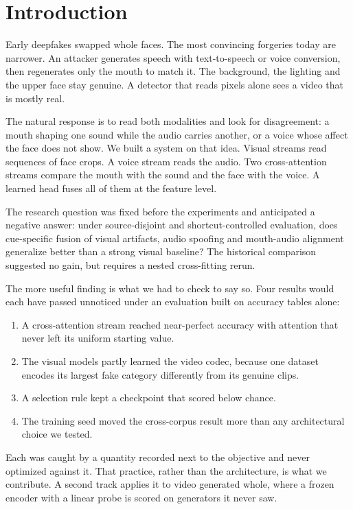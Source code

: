 \documentclass[conference]{IEEEtran}
\begin{document}
\section{Introduction}

Early deepfakes swapped whole faces. The most convincing forgeries today are
narrower. An attacker generates speech with text-to-speech or voice
conversion, then regenerates only the mouth to match it. The background, the
lighting and the upper face stay genuine. A detector that reads pixels alone
sees a video that is mostly real.

The natural response is to read both modalities and look for disagreement: a
mouth shaping one sound while the audio carries another, or a voice whose
affect the face does not show. We built a system on that idea. Visual streams
read sequences of face crops. A voice stream reads the audio. Two
cross-attention streams compare the mouth with the sound and the face with the
voice. A learned head fuses all of them at the feature level.

The research question was fixed before the experiments and anticipated a
negative answer: under source-disjoint and shortcut-controlled evaluation,
does cue-specific fusion of visual artifacts, audio spoofing and mouth-audio
alignment generalize better than a strong visual baseline? The historical
comparison suggested no gain, but requires a nested cross-fitting rerun.

The more useful finding is what we had to check to say so. Four results would
each have passed unnoticed under an evaluation built on accuracy tables alone:

\begin{enumerate}
\item A cross-attention stream reached near-perfect accuracy with attention
that never left its uniform starting value.
\item The visual models partly learned the video codec, because one dataset
encodes its largest fake category differently from its genuine clips.
\item A selection rule kept a checkpoint that scored below chance.
\item The training seed moved the cross-corpus result more than any
architectural choice we tested.
\end{enumerate}

Each was caught by a quantity recorded next to the objective and never
optimized against it. That practice, rather than the architecture, is what we
contribute. A second track applies it to video generated whole, where a frozen
encoder with a linear probe is scored on generators it never saw.
\end{document}
